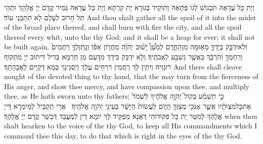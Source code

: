 {וְיָת כָּל עֲדָאַהּ תִּכְנוֹשׁ לְגוֹ פְּתָאַהּ וְתוֹקֵיד בְּנוּרָא יָת קַרְתָּא וְיָת כָּל עֲדָאַהּ גְּמִיר קֳדָם יְיָ אֱלָהָךְ וּתְהֵי תֵּל חָרוּב לְעָלַם לָא תִתְבְּנֵי עוֹד׃}
{And thou shalt gather all the spoil of it into the midst of the broad place thereof, and shall burn with fire the city, and all the spoil thereof every whit, unto the \lord\space thy God; and it shall be a heap for ever; it shall not be built again.}{}
{וְלֹֽא\maqqaf יִדְבַּ֧ק בְּיָדְךָ֛ מְא֖וּמָה מִן\maqqaf הַחֵ֑רֶם לְמַ֩עַן֩ יָשׁ֨וּב יְהֹוָ֜ה מֵחֲר֣וֹן אַפּ֗וֹ וְנָֽתַן\maqqaf לְךָ֤ רַחֲמִים֙ וְרִֽחַמְךָ֣ וְהִרְבֶּ֔ךָ כַּאֲשֶׁ֥ר נִשְׁבַּ֖ע לַאֲבֹתֶֽיךָ׃}
{וְלָא יִדְבַּק בִּידָךְ מִדָּעַם מִן חֶרְמָא בְּדִיל דִּיתוּב יְיָ מִתְּקוֹף רוּגְזֵיהּ וְיִתֵּין לָךְ רַחֲמִין וִירַחֵים עֲלָךְ וְיַסְגֵּינָךְ כְּמָא דְּקַיֵּים לַאֲבָהָתָךְ׃}
{And there shall cleave nought of the devoted thing to thy hand, that the \lord\space may turn from the fierceness of His anger, and show thee mercy, and have compassion upon thee, and multiply thee, as He hath sworn unto thy fathers;}{}
{כִּ֣י תִשְׁמַ֗ע בְּקוֹל֙ יְהֹוָ֣ה אֱלֹהֶ֔יךָ לִשְׁמֹר֙ אֶת\maqqaf כׇּל\maqqaf מִצְוֺתָ֔יו אֲשֶׁ֛ר אָנֹכִ֥י מְצַוְּךָ֖ הַיּ֑וֹם לַעֲשׂוֹת֙ הַיָּשָׁ֔ר בְּעֵינֵ֖י יְהֹוָ֥ה אֱלֹהֶֽיךָ׃ \setuma }
{אֲרֵי תְקַבֵּיל לְמֵימְרָא דַּייָ אֱלָהָךְ לְמִטַּר יָת כָּל פִּקּוֹדוֹהִי דַּאֲנָא מְפַקֵּיד לָךְ יוֹמָא דֵין לְמֶעֱבַד דְּכָשַׁר קֳדָם יְיָ אֱלָהָךְ׃}
{when thou shalt hearken to the voice of the \lord\space thy God, to keep all His commandments which I command thee this day, to do that which is right in the eyes of the \lord\space thy God.}{}

